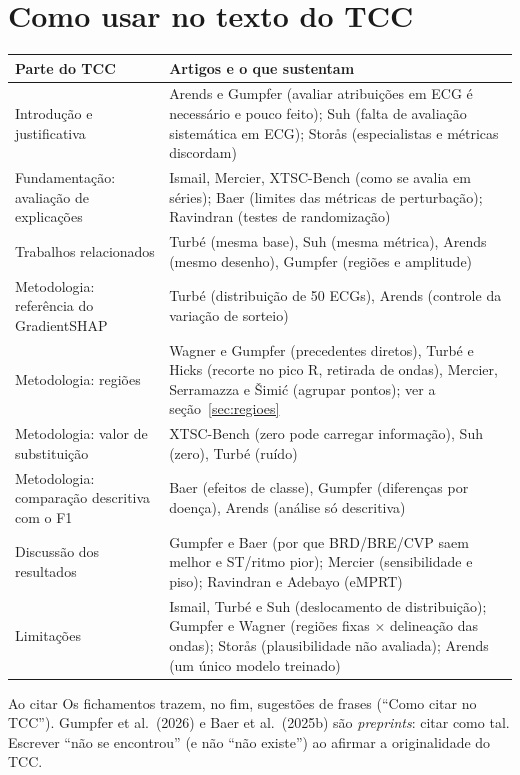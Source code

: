 \documentclass[11pt,a4paper]{article}
\begin{document}
\section{Como usar no texto do TCC}\label{sec:uso}
\begin{center}\small
\begin{tabularx}{\linewidth}{>{\raggedright\arraybackslash}p{3.3cm}X}
\toprule
\textbf{Parte do TCC} & \textbf{Artigos e o que sustentam} \\
\midrule
Introdução e justificativa & Arends e Gumpfer (avaliar atribuições em ECG é necessário e pouco feito); Suh (falta de avaliação sistemática em ECG); Storås (especialistas e métricas discordam) \\ \addlinespace
Fundamentação: avaliação de explicações & Ismail, Mercier, XTSC-Bench (como se avalia em séries); Baer (limites das métricas de perturbação); Ravindran (testes de randomização) \\ \addlinespace
Trabalhos relacionados & Turbé (mesma base), Suh (mesma métrica), Arends (mesmo desenho), Gumpfer (regiões e amplitude) \\ \addlinespace
Metodologia: referência do GradientSHAP & Turbé (distribuição de 50 ECGs), Arends (controle da variação de sorteio) \\ \addlinespace
Metodologia: regiões & Wagner e Gumpfer (precedentes diretos), Turbé e Hicks (recorte no pico R, retirada de ondas), Mercier, Serramazza e Šimić (agrupar pontos); ver a seção~\ref{sec:regioes} \\ \addlinespace
Metodologia: valor de substituição & XTSC-Bench (zero pode carregar informação), Suh (zero), Turbé (ruído) \\ \addlinespace
Metodologia: comparação descritiva com o F1 & Baer (efeitos de classe), Gumpfer (diferenças por doença), Arends (análise só descritiva) \\ \addlinespace
Discussão dos resultados & Gumpfer e Baer (por que BRD/BRE/CVP saem melhor e ST/ritmo pior); Mercier (sensibilidade e piso); Ravindran e Adebayo (eMPRT) \\ \addlinespace
Limitações & Ismail, Turbé e Suh (deslocamento de distribuição); Gumpfer e Wagner (regiões fixas × delineação das ondas); Storås (plausibilidade não avaliada); Arends (um único modelo treinado) \\
\bottomrule
\end{tabularx}
\end{center}

\begin{infobox}[warn]{Ao citar}
Os fichamentos trazem, no fim, sugestões de frases (``Como citar no TCC''). Gumpfer et al.\ (2026) e Baer et al.\ (2025b) são \textit{preprints}: citar como tal. Escrever ``não se encontrou'' (e não ``não existe'') ao afirmar a originalidade do TCC.
\end{infobox}
\end{document}
